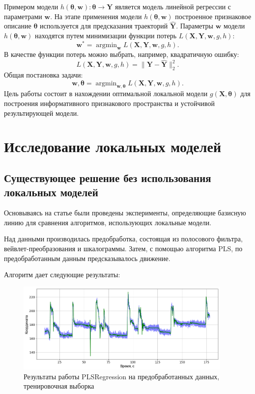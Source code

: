 \documentclass{mipt-thesis-bs}
\newcommand{\argmin}{\mathop{\mathrm{argmin}}}
\begin{document}
Примером модели $h(\mathbf{\theta}, \mathbf{w}): \mathbf{\theta}\to\mathbf{Y}$ является модель линейной регрессии с параметрами $\mathbf{w}$. На этапе применения модели $h(\mathbf{\theta}, \mathbf{w})$ построенное признаковое описание $\mathbf{\theta}$ используется для предсказания траекторий $\mathbf{\hat{Y}}$.
Параметры $\mathbf{w}$ модели $h(\mathbf{\theta}, \mathbf{w})$ находятся путем минимизации функции потерь $L(\mathbf{X}, \mathbf{Y}, \mathbf{w}, g, h)$:
\begin{equation}
\mathbf{w^*} = \argmin_{\mathbf{w}} L(\mathbf{X}, \mathbf{Y}, \mathbf{w}, g, h).
\end{equation}
В качестве функции потерь можно выбрать, например, квадратичную ошибку:
\begin{equation}
L(\mathbf{X}, \mathbf{Y}, \mathbf{w}, g, h) = \|\mathbf{Y}-\mathbf{\hat{Y}}\|^2_2.
\end{equation}
Общая постановка задачи:
\begin{equation}
\mathbf{w}, \mathbf{\theta} = \argmin_{\mathbf{w}, \mathbf{\theta}} L(\mathbf{X}, \mathbf{Y}, \mathbf{w}, g, h).
\end{equation}
Цель работы состоит в нахождении оптимальной локальной модели $g(\mathbf{X}, \mathbf{\theta})$ для построения информативного признакового пространства и устойчивой результирующей модели.




\chapter{Исследование локальных моделей}
\section{Существующее решение без использования локальных моделей}
Основываясь на статье \cite{Motrenko2018} были проведены эксперименты, определяющие базисную линию для сравнения алгоритмов, использующих локальные модели.

Над данными производилась предобработка, состоящая из полосового фильтра, вейвлет-преобразования и шкалограммы. Затем, с помощью алгоритма PLS, по предобработанным данным предсказывалось движение.

Алгоритм дает следующие результаты:

\begin{figure}
\begin{center}
	\includegraphics[width=300pt,height=\textheight,keepaspectratio]{imgs/motrenko-train.png}
	\caption{Результаты работы PLSRegression на предобработанных данных, тренировочная выборка}	
	\label{fig:motr train}
	\end{center}
\end{figure}
\end{document}
